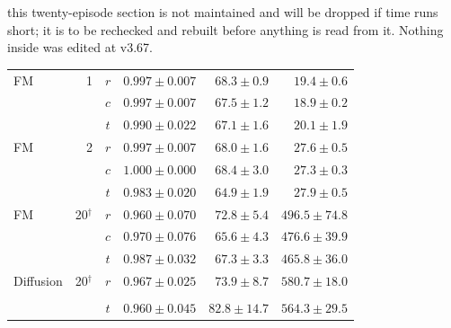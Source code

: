 \begin{deadblock}{this twenty-episode section is not maintained and will be dropped if time runs short; it
is to be rechecked and rebuilt before anything is read from it. Nothing inside was edited at v3.67.}
\begin{table}[htpb]
\begin{tabularx}{\linewidth}{@{}L r c rrr@{}}
    \midrule
    FM         & 1 & $r$ & $0.997 \pm 0.007$ & $68.3 \pm 0.9$ & $19.4 \pm 0.6$ \\
                     &    & \textbf{$c$} & \textbf{$0.997 \pm 0.007$} & \textbf{$67.5 \pm 1.2$} & \textbf{$18.9 \pm 0.2$} \\
                     &    & $t$ & $0.990 \pm 0.022$ & $67.1 \pm 1.6$ & $20.1 \pm 1.9$ \\
    FM         & 2 & $r$ & $0.997 \pm 0.007$ & $68.0 \pm 1.6$ & $27.6 \pm 0.5$ \\
                     &    & $c$ & $1.000 \pm 0.000$ & $68.4 \pm 3.0$ & $27.3 \pm 0.3$ \\
                     &    & $t$ & $0.983 \pm 0.020$ & $64.9 \pm 1.9$ & $27.9 \pm 0.5$ \\
    FM         & 20$^{\dagger}$ & $r$ & $0.960 \pm 0.070$ & $72.8 \pm 5.4$ & $496.5 \pm 74.8$ \\
                     &    & $c$ & $0.970 \pm 0.076$ & $65.6 \pm 4.3$ & $476.6 \pm 39.9$ \\
                     &    & $t$ & $0.987 \pm 0.032$ & $67.3 \pm 3.3$ & $465.8 \pm 36.0$ \\
    \midrule
    Diffusion  & 20$^{\dagger}$ & $r$ & $0.967 \pm 0.025$ & $73.9 \pm 8.7$ & $580.7 \pm 18.0$ \\
                     &    &  &  &  &   \\
                     &    & $t$ & $0.960 \pm 0.045$ & $82.8 \pm 14.7$ & $564.3 \pm 29.5$ \\
    \bottomrule
  \end{tabularx}
\end{table}
\begin{table}[htpb]
  \caption[What the twenty-episode evaluation covers]{What each cell of the twenty-episode evaluation
  rests on, counted from the corpus of record. A cell is complete at five training seeds on each of the
  three geometries; the entries below name every geometry that is short and the seeds it has. At
  $\nfe\in\{1,2\}$ every cell of every model is complete, and at $\nfe=20$ none is. These are also the
  slowest cells of the campaign, at half a second and more per control step against under thirty
  milliseconds.}
  \label{tab:coverage-k20}

\end{table}
\end{deadblock}
